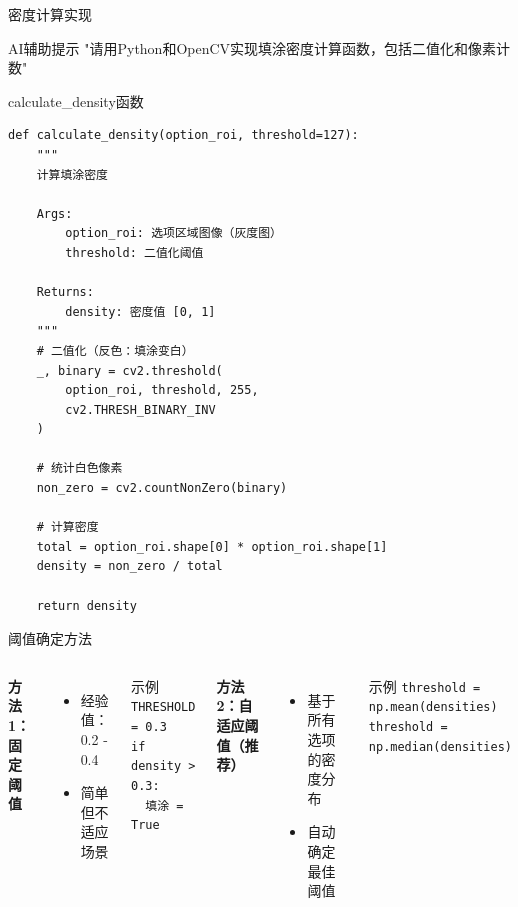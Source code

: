 \begin{frame}[fragile]{密度计算实现}
    \begin{block}{AI辅助提示}
        \aihint{} "请用Python和OpenCV实现填涂密度计算函数，包括二值化和像素计数"
    \end{block}

    \begin{block}{calculate\_density函数}
    \begin{lstlisting}[basicstyle=\ttfamily\scriptsize]
def calculate_density(option_roi, threshold=127):
    """
    计算填涂密度

    Args:
        option_roi: 选项区域图像（灰度图）
        threshold: 二值化阈值

    Returns:
        density: 密度值 [0, 1]
    """
    # 二值化（反色：填涂变白）
    _, binary = cv2.threshold(
        option_roi, threshold, 255,
        cv2.THRESH_BINARY_INV
    )

    # 统计白色像素
    non_zero = cv2.countNonZero(binary)

    # 计算密度
    total = option_roi.shape[0] * option_roi.shape[1]
    density = non_zero / total

    return density
    \end{lstlisting}
    \end{block}
\end{frame}

\begin{frame}{阈值确定方法}
    \begin{columns}
        \textbf{方法1：固定阈值}
        \begin{itemize}
            \item 经验值：0.2 - 0.4
            \item 简单但不适应场景
        \end{itemize}

        \begin{block}{示例}
        \texttt{THRESHOLD = 0.3}\\
        \texttt{if density > 0.3:}\\
        \texttt{~~填涂 = True}
        \end{block}

        \textbf{方法2：自适应阈值（推荐）}
        \begin{itemize}
            \item 基于所有选项的密度分布
            \item 自动确定最佳阈值
        \end{itemize}

        \begin{block}{示例}
        \texttt{threshold = np.mean(densities)}\\
        \texttt{threshold = np.median(densities)}
        \end{block}
    \end{columns}
\end{frame}

